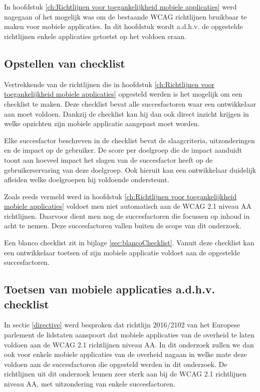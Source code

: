 \chapter{}
\label{ch:toetsenApplicaties}
In hoofdstuk \ref{ch:Richtlijnen voor toegankelijkheid mobiele applicaties} werd nagegaan of het mogelijk was om de bestaande WCAG richtlijnen bruikbaar te maken voor mobiele applicaties. In dit hoofdstuk wordt a.d.h.v. de opgestelde richtlijnen enkele applicaties getoetst op het voldoen eraan.
\section{Opstellen van checklist }
\label{sec:checklist}
Vertrekkende van de richtlijnen die in hoofdstuk \ref{ch:Richtlijnen voor toegankelijkheid mobiele applicaties} opgesteld werden is het mogelijk om een checklist te maken. Deze checklist bevat alle succesfactoren waar een ontwikkelaar aan moet voldoen. Dankzij de checklist kan hij dan ook direct inzicht krijgen in welke opzichten zijn mobiele applicatie aangepast moet worden. 

Elke succesfactor beschreven in de checklist bevat de slaagcriteria, uitzonderingen en de impact op de gebruiker. De score per doelgroep die de impact aanduidt toont aan hoeveel impact het slagen van de succesfactor heeft op de gebruikerservaring van deze doelgroep. Ook hieruit kan een ontwikkelaar duidelijk afleiden welke doelgroepen hij voldoende ondersteunt. 

Zoals reeds vermeld werd in hoofdstuk \ref{ch:Richtlijnen voor toegankelijkheid mobiele applicaties} voldoet men niet automatisch aan de WCAG 2.1 niveau AA richtlijnen. Daarvoor dient men nog de succesfactoren die focussen op inhoud in acht te nemen. Deze succesfactoren vallen buiten de scope van dit onderzoek. 

Een blanco checklist zit in bijlage \ref{sec:blancoChecklist}. Vanuit deze checklist kan een ontwikkelaar toetsen of zijn mobiele applicatie voldoet aan de opgestelde succesfactoren.

\section{Toetsen van mobiele applicaties a.d.h.v. checklist}
\label{sec:checklistTesting}

In sectie \ref{directive} werd besproken dat richtlijn 2016/2102 van het Europese parlement de lidstaten aanspoort dat mobiele applicaties van de overheid te laten voldoen aan de WCAG 2.1 richtlijnen niveau AA. In dit onderzoek zullen we dan ook voor enkele mobiele applicaties van de overheid nagaan in welke mate deze voldoen aan de succesfactoren die opgesteld werden in dit onderzoek. De richtlijnen uit dit onderzoek leunen zeer sterk aan bij de WCAG 2.1 richtlijnen niveau AA, met uitzondering van enkele succesfactoren.

